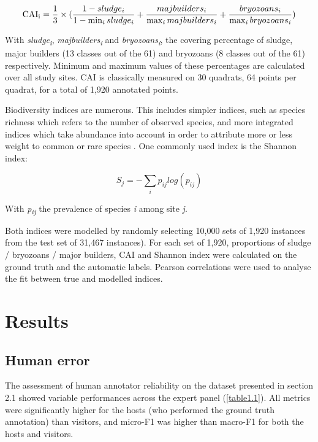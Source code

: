 \begin{equation}
\text{CAI\textsubscript{i}}=\frac{1}{3}\times(\frac{1-sludge_i}{1-\min_{i}sludge_i}+\frac{majbuilders_i}{\max_{i}majbuilders_i}+\frac{bryozoans_i}{\max_{i}bryozoans_i})
\label{eq1.7}
\end{equation}

With \textit{sludge\textsubscript{i}}, \textit{majbuilders\textsubscript{i}} and \textit{bryozoans\textsubscript{i}}, the covering percentage of sludge, major builders (13 classes out of the 61) and bryozoans (8 classes out of the 61) respectively. Minimum and maximum values of these percentages are calculated over all study sites. CAI is classically measured on 30 quadrats, 64 points per quadrat, for a total of 1,920 annotated points.

Biodiversity indices are numerous. This includes simpler indices, such as species richness which refers to the number of observed species, and more integrated indices which take abundance into account in order to attribute more or less weight to common or rare species \citep{magurran_measuring_2004}. One commonly used index is the Shannon index:

\begin{equation}
	S_j=-\sum_{i}p_{ij} log(p_{ij})
	\label{eq1.8}
\end{equation}

With \textit{p\textsubscript{ij}} the prevalence of species \textit{i} among site \textit{j}.

Both indices were modelled by randomly selecting 10,000 sets of 1,920 instances from the test set of 31,467 instances). For each set of 1,920, proportions of sludge / bryozoans / major builders, CAI and Shannon index were calculated on the ground truth and the automatic labels. Pearson correlations were used to analyse the fit between true and modelled indices.

\section{Results}\label{chapitre1_6}

\subsection{Human error}\label{chapitre1_6.1}
The assessment of human annotator reliability on the dataset presented in section 2.1 showed variable performances across the expert panel (\autoref{table1.1}). All metrics were significantly higher for the hosts (who performed the ground truth annotation) than visitors, and micro-F1 was higher than macro-F1 for both the hosts and visitors.


